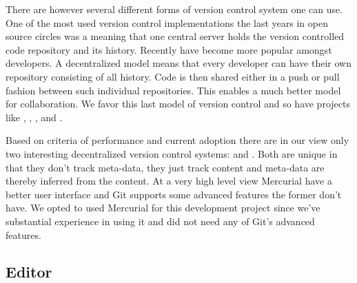 There are however several different forms of version control system one can
use. One of the most used version control implementations the last years
in open source circles was
%
\dash{}a  meaning that one central
server holds the version controlled code repository and its history.%
Recently  have become more popular
amongst developers. A decentralized model means that every developer can have
their own repository consisting of all history.%
Code is then shared either in a push or pull fashion between such individual
repositories. This enables a much better model for collaboration.
We favor this last model of version control and so have projects
like , , ,
and .%

Based on criteria of performance and current adoption there are in our view
only two interesting decentralized version control systems:
%
and .%
Both are unique in that they don't track meta-data, they just track
content and meta-data are thereby inferred from the content.
At a very high level view Mercurial have a better user interface and Git
supports some advanced features the former don't have. We opted to used
Mercurial for this development project since we've substantial experience in
using it and did not need any of Git's advanced features.

\subsection{Editor}

